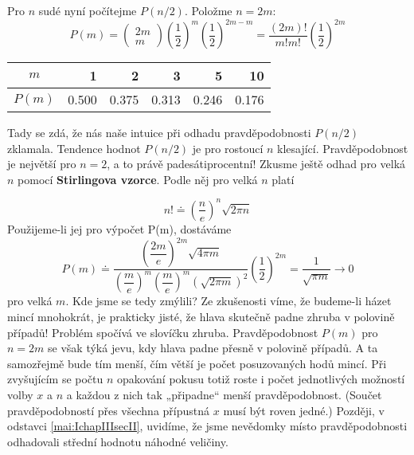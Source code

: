 \begin{example}
  Pro \(n\) sudé nyní počítejme \(P(n/2)\). Položme \(n = 2m\):
  \begin{equation*}
    P(m) = \begin{pmatrix} 2m \\ m\end{pmatrix} 
           \left(\dfrac{1}{2}\right)^m\left(\dfrac{1}{2}\right)^{2m-m} 
         = \dfrac{(2m)!}{m!m!}\left(\dfrac{1}{2}\right)^{2m}     
  \end{equation*}

  \begin{table}[ht!]
    \centering
    \begin{tabular}{c|rrrrr}
      \(m\)    & 1 & 2 & 3 & 5 & 10  \\ \hline
      \(P(m)\) & \num{0.500} & \num{0.375} & \num{0.313} & \num{0.246} & \num{0.176}
    \end{tabular}
  \end{table}
  
  Tady se zdá, že nás naše intuice při odhadu pravděpodobnosti \(P(n/2)\) zklamala. Tendence hodnot 
  \(P(n/2)\) je pro rostoucí \(n\) klesající. Pravděpodobnost je největší pro \(n = 2\), a to právě 
  padesátiprocentní! Zkusme ještě odhad pro velká \(n\) pomocí \textbf{Stirlingova vzorce}. Podle 
  něj pro velká \(n\) platí
  
  \begin{equation}\label{mai:eq056}
    n! \doteq \left(\dfrac{n}{e}\right)^n\sqrt{2\pi n}
  \end{equation}
  Použijeme-li jej pro výpočet P(m), dostáváme
  \begin{equation*}
    P(m)\doteq \dfrac{\left(\dfrac{2m}{e}\right)^{2m}\sqrt{4\pi m}}
     {\left(\dfrac{m}{e}\right)^m\left(\dfrac{m}{e}\right)^m\left(\sqrt{2\pi m}\right)^2}
     \left(\dfrac{1}{2}\right)^{2m} = \dfrac{1}{\sqrt{\pi m}} \longrightarrow 0
  \end{equation*}
  pro velká \(m\). Kde jsme se tedy zmýlili? Ze zkušenosti víme, že budeme-li házet mincí 
  mnohokrát, je prakticky jisté, že hlava skutečně padne zhruba v polovině případů! Problém spočívá 
  ve slovíčku zhruba. Pravděpodobnost \(P(m)\) pro \(n = 2m\) se však týká jevu, kdy hlava padne 
  přesně v polovině případů. A ta samozřejmě bude tím menší, čím větší je počet posuzovaných hodů 
  mincí. Při zvyšujícím se počtu \(n\) opakování pokusu totiž roste i počet jednotlivých možností 
  volby \(x\) a \(n\) a každou z nich tak „připadne“ menší pravděpodobnost. (Součet  
  pravděpodobností přes všechna přípustná \(x\) musí být roven jedné.) Později, v odstavci 
  \ref{mai:IchapIIIsecII}, uvidíme, že jsme nevědomky místo pravděpodobnosti odhadovali střední 
  hodnotu náhodné veličiny.
  

\end{example}

